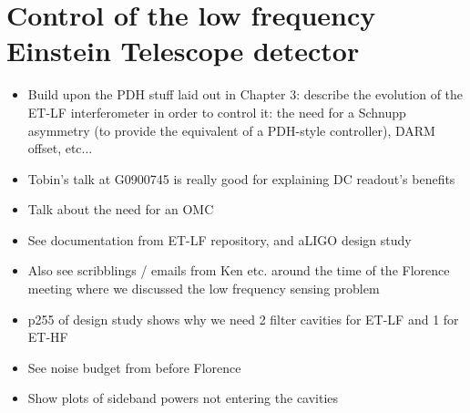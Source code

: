 \chapter{\label{c:et-lf-control}Control of the low frequency Einstein Telescope detector}

\begin{itemize}
  \item Build upon the PDH stuff laid out in Chapter 3: describe the evolution of the ET-LF interferometer in order to control it: the need for a Schnupp asymmetry (to provide the equivalent of a PDH-style controller), DARM offset, etc...
  
  \item Tobin's talk at G0900745 is really good for explaining DC readout's benefits
  
  \item Talk about the need for an OMC
  
  \item See documentation from ET-LF repository, and aLIGO design study
  
  \item Also see scribblings / emails from Ken etc. around the time of the Florence meeting where we discussed the low frequency sensing problem
  
  \item p255 of design study shows why we need 2 filter cavities for ET-LF and 1 for ET-HF
  
  \item See noise budget from before Florence
  
  \item Show plots of sideband powers not entering the cavities


\end{itemize}
